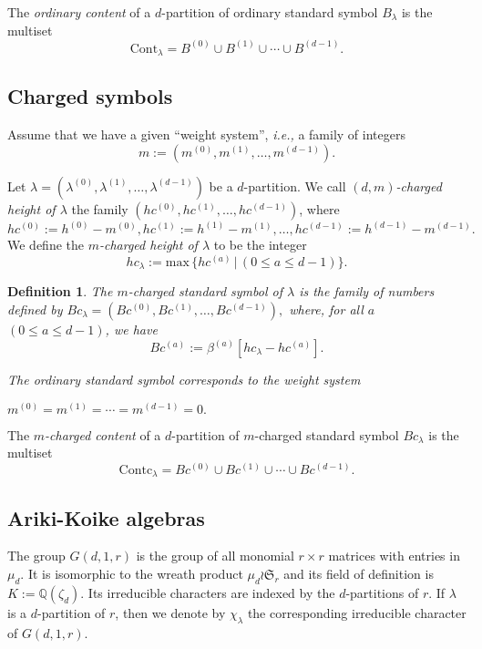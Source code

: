 \documentclass[10pt,a4paper,titlepage]{article}
\newtheorem{definition}[theorem]{Definition}
\newcommand{\el}{\lambda}
\newcommand{\eb}{\beta}
\newcommand{\ie}{\emph{i.e., }}
\begin{document}
The \emph{ordinary content} of a $d$-partition of ordinary standard symbol $B_\el$ is the multiset
$$\mathrm{Cont}_\el = B^{(0)} \cup B^{(1)} \cup \cdots \cup B^{(d-1)}.$$


\subsection*{\normalsize Charged symbols}

Assume that we have a given ``weight system'', \ie a family of integers
$$m:=(m^{(0)},m^{(1)},\ldots,m^{(d-1)}).$$

Let  $\el=(\el^{(0)},\el^{(1)},\ldots,\el^{(d-1)})$ be a $d$-partition.  We call \emph{$(d,m)$-charged height of $\el$} the family $(hc^{(0)},hc^{(1)},\ldots,hc^{(d-1)})$, where
$$hc^{(0)}:=h^{(0)}-m^{(0)},hc^{(1)}:=h^{(1)}-m^{(1)},\ldots,hc^{(d-1)}:=h^{(d-1)}-m^{(d-1)}.$$
We define the 
 \emph{$m$-charged height of $\el$} to be the integer
$$hc_\el:=\mathrm{max}\,\{hc^{(a)} \,|\, (0 \leq a \leq d-1)\}.$$

\begin{definition}\label{charged standard symbol}
The $m$-charged standard symbol of $\el$ is the family of numbers defined by
$Bc_\el=(Bc^{(0)},Bc^{(1)},\ldots,Bc^{(d-1)}),$
where, for all $a$ $(0 \leq a \leq d-1)$, we have
$$Bc^{(a)}:=\eb^{(a)}[hc_\el-hc^{(a)}].$$
\end{definition}
\begin{remark} \emph{The ordinary standard symbol corresponds to the weight system }
\begin{center}
$m^{(0)}=m^{(1)}=\cdots=m^{(d-1)}=0.$
\end{center}
\end{remark}

The \emph{$m$-charged content} of a $d$-partition of $m$-charged standard symbol $Bc_\el$ is the multiset
$$\mathrm{Contc}_\el = Bc^{(0)} \cup Bc^{(1)} \cup \cdots \cup Bc^{(d-1)}.$$

\subsection{Ariki-Koike algebras}

The group $G(d,1,r)$ is the group of all monomial $r \times r$ matrices with entries in $\mu_d$. It is isomorphic to the wreath product $\mu_d \wr
\mathfrak{S}_r$  and its field of definition is $K:=\mathbb{Q}(\zeta_d)$. Its irreducible characters are indexed by the $d$-partitions of $r$. If $\el$ is a $d$-partition of $r$, then we denote by $\chi_\el$ the corresponding irreducible character of $G(d,1,r)$.
\end{document}
